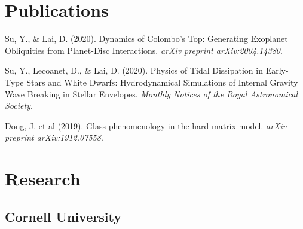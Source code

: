 \documentclass[]{yubo-resume-openfont}
\begin{document}
\hfill
\begin{minipage}[t]{0.66\textwidth}


\section{Publications}
\begin{tightemize}
    \item Su, Y., \& Lai, D. (2020).
        Dynamics of Colombo's Top: Generating Exoplanet Obliquities from
        Planet-Disc Interactions. \emph{arXiv preprint arXiv:2004.14380}.
    \item Su, Y., Lecoanet, D., \& Lai, D. (2020).
        Physics of Tidal Dissipation in Early-Type Stars and White Dwarfs:
        Hydrodynamical Simulations of Internal Gravity Wave Breaking in
        Stellar Envelopes. \emph{Monthly Notices of the Royal Astronomical
        Society}.
    \item Dong, J. et al (2019).
        Glass phenomenology in the hard matrix model.
        \emph{arXiv preprint arXiv:1912.07558}.
\end{tightemize}
\sectionsep
\section{Research}

\subsection{Cornell University}
\ifisCS
\else
    \vspace{\topsep} %
\fi
{}
\sectionsep


\end{minipage}
\end{document}
